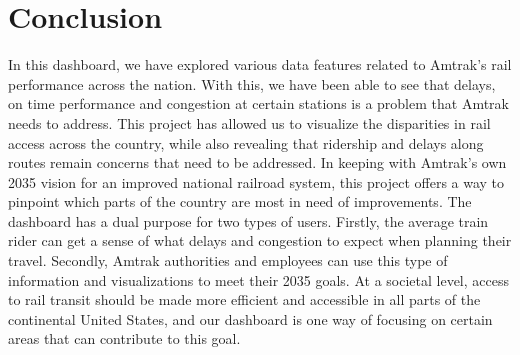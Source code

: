 \documentclass[runningheads]{llncs}
\begin{document}
\section{Conclusion}
In this dashboard, we have explored various data features related to Amtrak’s rail performance across the nation. With this, we have been able to see that delays, on time performance and congestion at certain stations is a problem that Amtrak needs to address. This project has allowed us to visualize the disparities in rail access across the country, while also revealing that ridership and delays along routes remain concerns that need to be addressed. In keeping with Amtrak’s own 2035 vision for an improved national railroad system, this project offers a way to pinpoint which parts of the country are most in need of improvements. The dashboard has a dual purpose for two types of users. Firstly, the average train rider can get a sense of what delays and congestion to expect when planning their travel. Secondly, Amtrak authorities and employees can use this type of information and visualizations to meet their 2035 goals. At a societal level, access to rail transit should be made more efficient and accessible in all parts of the continental United States, and our dashboard is one way of focusing on certain areas that can contribute to this goal.

%
%

%
%
%


%
\end{document}
